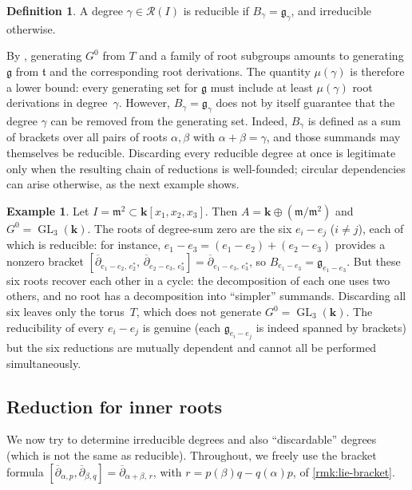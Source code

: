 \documentclass[11pt,letterpaper,reqno]{amsart}
\theoremstyle{remark}
\theoremstyle{definition}
\newtheorem{definition}[definition]{Definition}
\newtheorem{example}[example]{Example}
\def\M{\mathfrak{m}}
\newcommand{\KK}[0]{\ensuremath{\mathbf{k}}}
\newcommand{\GL}[0]{\ensuremath{\operatorname{GL}}}
\begin{document}
\begin{definition}\label{def:irreducible-degree}
A degree $\gamma\in\mathcal R(I)$ is reducible if $B_\gamma=\mathfrak
g_\gamma$, and irreducible otherwise. 

\end{definition}
By \cite[Section~13.1, Theorem]{Humphreys}, generating $G^0$ from $T$ and a family
of root subgroups amounts to generating $\mathfrak g$ from $\mathfrak t$ and the
corresponding root derivations. The quantity $\mu(\gamma)$ is therefore a
lower bound: every generating set for $\mathfrak g$ must include at
least $\mu(\gamma)$ root derivations in degree~$\gamma$. However,
$B_\gamma=\mathfrak g_\gamma$ does not by itself guarantee that the degree
$\gamma$ can be removed from the generating set. Indeed, $B_\gamma$ is defined
as a sum of brackets over all pairs of roots $\alpha,\beta$ with
$\alpha+\beta=\gamma$, and those summands may themselves be reducible.
Discarding every reducible degree at once is legitimate only when the resulting
chain of reductions is well-founded; circular dependencies can arise otherwise,
as the next example shows.

\begin{example}\label{ex:reducible-not-discardable}
Let $I=\M^2\subset\KK[x_1,x_2,x_3]$. Then
$A=\KK\oplus(\M/\M^2)$ and $G^0=\GL_3(\KK)$. The roots of
degree-sum zero are the six $e_i-e_j$ ($i\neq j$), each of which is reducible:
for instance, $e_1-e_3=(e_1-e_2)+(e_2-e_3)$ provides a nonzero bracket
$[\overline\partial_{e_1-e_2,\,e_2^*},\,
  \overline\partial_{e_2-e_3,\,e_3^*}]
= \overline\partial_{e_1-e_3,\,e_3^*}$,
so $B_{e_1-e_3}=\mathfrak g_{e_1-e_3}$. But these six roots recover each other
in a cycle: the decomposition of each one uses two others, and no root has a
decomposition into ``simpler'' summands. Discarding all six leaves only the
torus~$T$, which does not generate $G^0=\GL_3(\KK)$. The reducibility of every
$e_i-e_j$ is genuine (each $\mathfrak g_{e_i-e_j}$ is indeed spanned by
brackets) but the six reductions are mutually dependent and cannot all be
performed simultaneously.
\end{example}


\subsection{Reduction for inner roots} We now try to determine irreducible degrees and also ``discardable'' degrees (which is not the same as reducible). Throughout, we freely use the bracket formula
$[\overline\partial_{\alpha,p},\overline\partial_{\beta,q}]
=\overline\partial_{\alpha+\beta,\,r}$, with $r=p(\beta)q-q(\alpha)p$, of
\cref{rmk:lie-bracket}.
\end{document}
